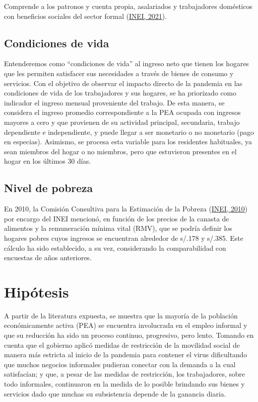\documentclass[
  letterpaper,
  12pt,
  oneside,
  spanish,
  doublespacing,
  headsepline,
  parskip]{MastersDoctoralThesis}
\begin{document}
Comprende a los patronos y cuenta propia, asalariados y trabajadores
domésticos con beneficios sociales del sector formal
(\protect\hyperlink{ref-inei2021}{INEI, 2021}).

\hypertarget{condiciones-de-vida}{%
\section{Condiciones de vida}\label{condiciones-de-vida}}

Entenderemos como ``condiciones de vida'' al ingreso neto que tienen los
hogares que les permiten satisfacer sus necesidades a través de bienes
de consumo y servicios. Con el objetivo de observar el impacto directo
de la pandemia en las condiciones de vida de los trabajadores y sus
hogares, se ha priorizado como indicador el ingreso mensual proveniente
del trabajo. De esta manera, se considera el ingreso promedio
correspondiente a la PEA ocupada con ingresos mayores a cero y que
provienen de su actividad principal, secundaria, trabajo dependiente e
independiente, y puede llegar a ser monetario o no monetario (pago en
especias). Asimismo, se procesa esta variable para los residentes
habituales, ya sean miembros del hogar o no miembros, pero que
estuvieron presentes en el hogar en los últimos 30 días.

\hypertarget{nivel-de-pobreza}{%
\section{Nivel de pobreza}\label{nivel-de-pobreza}}

En 2010, la Comisión Consultiva para la Estimación de la Pobreza
(\protect\hyperlink{ref-inei2010}{INEI, 2010}) por encargo del INEI
mencionó, en función de los precios de la canasta de alimentos y la
remuneración mínima vital (RMV), que se podría definir los hogares
pobres cuyos ingresos se encuentran alrededor de s/.178 y s/.385. Este
cálculo ha sido establecido, a su vez, considerando la comparabilidad
con encuestas de años anteriores.


\hypertarget{sec-hipotesis}{%
\chapter{Hipótesis}\label{sec-hipotesis}}

A partir de la literatura expuesta, se muestra que la mayoría de la
población económicamente activa (PEA) se encuentra involucrada en el
empleo informal y que su reducción ha sido un proceso continuo,
progresivo, pero lento. Tomando en cuenta que el gobierno aplicó medidas
de restricción de la movilidad social de manera más estricta al inicio
de la pandemia para contener el virus dificultando que muchos negocios
informales pudieran conectar con la demanda a la cual satisfacían; y
que, a pesar de las medidas de restricción, los trabajadores, sobre todo
informales, continuaron en la medida de lo posible brindando sus bienes
y servicios dado que muchas su subsistencia depende de la ganancia
diaria.
\end{document}
